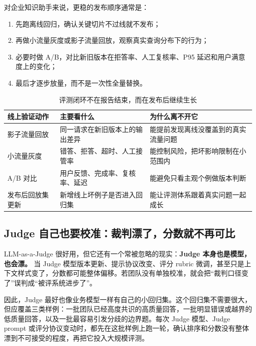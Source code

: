 对企业知识助手来说，更稳的发布顺序通常是：
\begin{enumerate}
  \item 先跑离线回归，确认关键切片不过线就不发布；
  \item 再做小流量灰度或影子流量回放，观察真实查询分布下的行为；
  \item 必要时做 A/B，对比新旧版本在拒答率、人工复核率、P95 延迟和用户满意度上的变化；
  \item 最后才逐步放量，而不是一次性全量替换。
\end{enumerate}

\begin{table}[H]
\centering
\small
\begin{tabularx}{\textwidth}{>{\raggedright\arraybackslash}p{3cm}>{\raggedright\arraybackslash}p{3.2cm}>{\raggedright\arraybackslash}X}
\toprule
\textbf{线上验证动作} & \textbf{主要看什么} & \textbf{为什么离不开它} \\
\midrule
影子流量回放 & 同一请求在新旧版本上的输出差异 & 能提前发现离线没覆盖到的真实流量问题 \\
小流量灰度 & 错答、拒答、超时、人工接管率 & 能控制风险，把坏影响限制在小范围内 \\
A/B 对比 & 用户反馈、完成率、复核率、延迟 & 能避免只看主观个例做版本判断 \\
发布后回放集更新 & 新增线上坏例子是否进入回归集 & 能让评测体系跟着真实问题一起成长 \\
\bottomrule
\end{tabularx}
\caption{评测闭环不在报告结束，而在发布后继续生长}
\label{tab:online-eval-actions}
\end{table}

\subsection{Judge 自己也要校准：裁判漂了，分数就不再可比}
LLM-as-a-Judge 很好用，但它还有一个常被忽略的现实：\textbf{Judge 本身也是模型，也会漂。} 当 Judge 模型版本更新、提示协议改变、评分 rubric 微调，甚至只是上下文样式变了，分数都可能整体偏移。若团队没有单独校准，就会把“裁判口径变了”误判成“被评系统进步了”。

因此，Judge 最好也像业务模型一样有自己的小回归集。这个回归集不需要很大，但应覆盖三类样例：一批团队已经高度共识的高质量回答，一批明显错误或越界的低质量回答，以及一批最容易引发分歧的边界题。每次 Judge 模型、Judge prompt 或评分协议变动时，都先在这批样例上跑一轮，确认排序和分数没有整体漂到不可接受的程度，再把它投入大规模评测。

